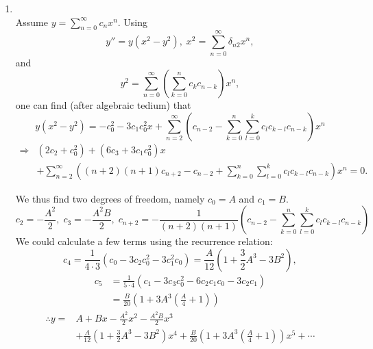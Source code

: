 \item
\begin{enumerate}[wide, labelindent=0pt, label= (\alph*)]
\item \mbox{}\\
Assume $y = \sum_{n=0}^\infty c_n x^n$.
Using
\[
	y'' = y \left( x^2 - y^2 \right),\; x^2 = \sum_{n=0}^\infty \delta_{n2} x^n,
\]
and
\[
	y^2 = \sum_{n=0}^\infty \left( \sum_{k=0}^n c_k c_{n - k} \right) x^n,
\]
one can find (after algebraic tedium) that
\[
	y \left( x^2 - y^2 \right)
	= -c_0^2 - 3c_1 c_0^2 x + \sum_{n=2}^\infty \left(
		c_{n - 2} - \sum_{k=0}^n \sum_{l=0}^k c_l c_{k - l} c_{n - k}
	\right) x^n
\]
\begin{align*}
	\Rightarrow
	&\left( 2c_2 + c_0^2 \right)
	+ \left( 6c_3 + 3c_1 c_0^2 \right) x \\
	&+ \sum_{n=2}^\infty \left(
		(n + 2)(n + 1) c_{n + 2} - c_{n - 2}
		+ \sum_{k=0}^n \sum_{l=0}^k c_l c_{k - l} c_{n - k}
	\right) x^n = 0.
\end{align*}

We thus find two degrees of freedom, namely $c_0 = A$ and $c_1 = B$.
\[
	c_2 = -\frac{A^2}{2},\;
	c_3 = -\frac{A^2 B}{2},\;
	c_{n + 2} = -\frac{1}{(n + 2)(n + 1)} \left(
		c_{n - 2} - \sum_{k=0}^n \sum_{l = 0}^k c_l c_{k - l} c_{n - k}
	\right)
\]
We could calculate a few terms using the recurrence relation:
\[
	c_4
	= \frac{1}{4 \cdot 3} \left(
		c_0 - 3c_2 c_0^2 - 3c_1^2 c_0
	\right)
	= \frac{A}{12} \left(
		1 + \frac{3}{2}A^3 - 3B^2
	\right),
\]
\begin{align*}
	c_5
	&= \frac{1}{5 \cdot 4} \left(
		c_1 - 3c_3 c_0^2 - 6c_2 c_1 c_0 - 3c_2 c_1
	\right) \\
	&= \frac{B}{20} \left(
		1 + 3A^3 \left( \frac{A}{4} + 1 \right)
	\right)
\end{align*}
\begin{align*}
	\therefore
	y
	=& A + Bx
	- \frac{A^2}{2}x^2
	- \frac{A^2 B}{2}x^3 \\
	&+ \frac{A}{12} \left(
		1 + \frac{3}{2}A^3 - 3B^2
	\right) x^4
	+ \frac{B}{20} \left(
		1 + 3A^3 \left( \frac{A}{4} + 1 \right)
	\right) x^5
	+ \cdots
\end{align*}


\end{enumerate}
